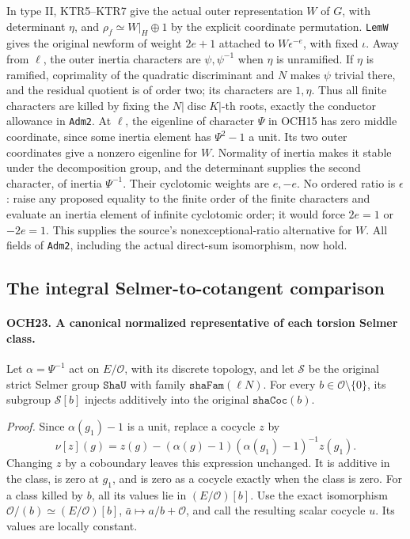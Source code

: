 In type II, KTR5--KTR7 give the actual outer representation \(W\)
of \(G\), with determinant \(\eta\), and
\(\rho_f\simeq W|_H\oplus1\) by the explicit coordinate
permutation.  \texttt{LemW} gives the original newform of weight
\(2e+1\) attached to \(W\epsilon^{-e}\), with fixed \(\iota\).
Away from \(\ell\), the outer inertia characters are
\(\psi,\psi^{-1}\) when \(\eta\) is unramified.  If
\(\eta\) is ramified, coprimality of the quadratic discriminant
and \(N\) makes \(\psi\) trivial there, and the residual
quotient is of order two; its characters are \(1,\eta\).
Thus all finite characters are killed by fixing the
\(N|\operatorname{disc}K|\)-th roots, exactly the conductor
allowance in \texttt{Adm2}.
At \(\ell\), the eigenline of character \(\Psi\) in
OCH15 has zero middle coordinate, since some inertia element has
\(\Psi^2-1\) a unit.  Its two outer coordinates give a
nonzero eigenline for \(W\).  Normality of inertia makes it
stable under the decomposition group, and the determinant supplies
the second character, of inertia \(\Psi^{-1}\).
Their cyclotomic weights are \(e,-e\).  No ordered ratio is
\(\epsilon\): raise any proposed equality to the finite order
of the finite characters and evaluate an inertia element of
infinite cyclotomic order; it would force \(2e=1\) or
\(-2e=1\).  This supplies the source's nonexceptional-ratio
alternative for \(W\).  All fields of \texttt{Adm2}, including
the actual direct-sum isomorphism, now hold.

\subsection{The integral Selmer-to-cotangent comparison}

\paragraph{OCH23. A canonical normalized representative of each torsion Selmer class.}
\label{claim:OCH23}
Let \(\alpha=\Psi^{-1}\) act on \(E/\mathcal O\), with
its discrete topology, and let \(\mathcal S\) be the original
strict Selmer group \(\texttt{ShaU}\) with family
\(\texttt{shaFam}(\ell N)\).  For every
\(b\in\mathcal O\setminus\{0\}\), its subgroup
\(\mathcal S[b]\) injects additively into the original
\(\texttt{shaCoc}(b)\).

\emph{Proof.}
Since \(\alpha(g_1)-1\) is a unit, replace a cocycle \(z\)
by
\[
 \nu[z](g)=z(g)-(\alpha(g)-1)
                     (\alpha(g_1)-1)^{-1}z(g_1).
 \tag{OCH.14}
\]
Changing \(z\) by a coboundary leaves this expression unchanged.
It is additive in the class, is zero at \(g_1\), and is zero
as a cocycle exactly when the class is zero.  For a class killed
by \(b\), all its values lie in \((E/\mathcal O)[b]\).
Use the exact isomorphism
\(\mathcal O/(b)\simeq(E/\mathcal O)[b]\),
\(\bar a\mapsto a/b+\mathcal O\), and call the resulting
scalar cocycle \(u\).  Its values are locally constant.

